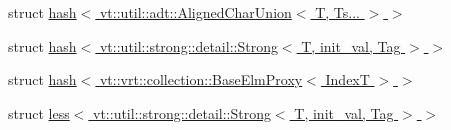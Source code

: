 \begin{DoxyCompactItemize}
struct \hyperlink{structstd_1_1hash_3_01vt_1_1util_1_1adt_1_1_aligned_char_union_3_01_t_00_01_ts_8_8_8_01_4_01_4}{hash$<$ vt\+::util\+::adt\+::\+Aligned\+Char\+Union$<$ T, Ts... $>$ $>$}
\item 
struct \hyperlink{structstd_1_1hash_3_01vt_1_1util_1_1strong_1_1detail_1_1_strong_3_01_t_00_01init__val_00_01_tag_01_4_01_4}{hash$<$ vt\+::util\+::strong\+::detail\+::\+Strong$<$ T, init\+\_\+val, Tag $>$ $>$}
\item 
struct \hyperlink{structstd_1_1hash_3_01vt_1_1vrt_1_1collection_1_1_base_elm_proxy_3_01_index_t_01_4_01_4}{hash$<$ vt\+::vrt\+::collection\+::\+Base\+Elm\+Proxy$<$ Index\+T $>$ $>$}
\item 
struct \hyperlink{structstd_1_1less_3_01vt_1_1util_1_1strong_1_1detail_1_1_strong_3_01_t_00_01init__val_00_01_tag_01_4_01_4}{less$<$ vt\+::util\+::strong\+::detail\+::\+Strong$<$ T, init\+\_\+val, Tag $>$ $>$}
\end{DoxyCompactItemize}
